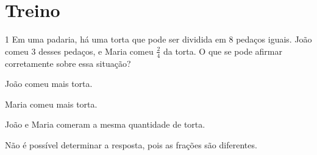 







\section*{Treino}

\num{1}  Em uma padaria, há uma torta que pode ser dividida em $8$ pedaços
iguais. João comeu $3$ desses pedaços, e Maria comeu $\frac{2}{4}$ da torta.
O que se pode afirmar corretamente sobre essa situação?

\begin{escolha}
\item João comeu mais torta.
\item Maria comeu mais torta.
\item João e Maria comeram a mesma quantidade de torta.
\item Não é possível determinar a resposta, pois as frações são diferentes.
\end{escolha}




